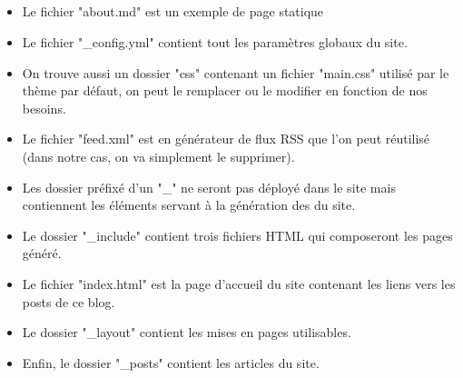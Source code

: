 \documentclass[11pt,a4paper,twoside]{report}
\begin{document}
				\subparagraph*{}
					\begin{itemize}
						\item Le fichier "about.md" est un exemple de page statique
						\item Le fichier "\_config.yml" contient tout les paramètres globaux du site.
						\item On trouve aussi un dossier "css" contenant un fichier "main.css" utilisé par le thème par défaut, on peut le remplacer ou le modifier en fonction de nos besoins.
						\item Le fichier "feed.xml" est en générateur de flux RSS que l'on peut réutilisé (dans notre cas, on va simplement le supprimer).
						\item Les dossier préfixé d'un "\_" ne seront pas déployé dans le site mais contiennent les éléments servant à la génération des du site.
						\item Le dossier "\_include" contient trois fichiers HTML qui composeront les pages généré.
						\item Le fichier "index.html" est la page d'accueil du site contenant les liens vers les posts de ce blog.
						\item Le dossier "\_layout" contient les mises en pages utilisables.
						\item Enfin, le dossier "\_posts" contient les articles du site.
					\end{itemize}
\end{document}
